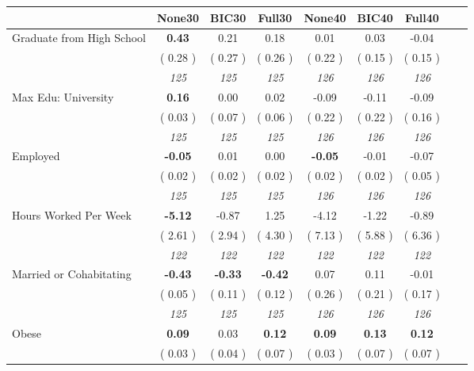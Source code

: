 \begin{tabular}{l c c c c c c c c}
\toprule
 & None30 & BIC30 & Full30 & None40 & BIC40 & Full40 \\
\midrule
Graduate from High School & \textbf{      0.43 } &      0.21 &      0.18 &      0.01 &      0.03 &     -0.04 \\
& (     0.28 ) & (     0.27 ) & (     0.26 ) & (     0.22 ) & (     0.15 ) & (     0.15 ) \\
& \textit{ 125 } & \textit{ 125 } & \textit{ 125 } & \textit{ 126 } & \textit{ 126 } & \textit{ 126 } \\
Max Edu: University & \textbf{      0.16 } &      0.00 &      0.02 &     -0.09 &     -0.11 &     -0.09 \\
& (     0.03 ) & (     0.07 ) & (     0.06 ) & (     0.22 ) & (     0.22 ) & (     0.16 ) \\
& \textit{ 125 } & \textit{ 125 } & \textit{ 125 } & \textit{ 126 } & \textit{ 126 } & \textit{ 126 } \\
Employed & \textbf{     -0.05 } &      0.01 &      0.00 & \textbf{     -0.05 } &     -0.01 &     -0.07 \\
& (     0.02 ) & (     0.02 ) & (     0.02 ) & (     0.02 ) & (     0.02 ) & (     0.05 ) \\
& \textit{ 125 } & \textit{ 125 } & \textit{ 125 } & \textit{ 126 } & \textit{ 126 } & \textit{ 126 } \\
Hours Worked Per Week & \textbf{     -5.12 } &     -0.87 &      1.25 &     -4.12 &     -1.22 &     -0.89 \\
& (     2.61 ) & (     2.94 ) & (     4.30 ) & (     7.13 ) & (     5.88 ) & (     6.36 ) \\
& \textit{ 122 } & \textit{ 122 } & \textit{ 122 } & \textit{ 122 } & \textit{ 122 } & \textit{ 122 } \\
Married or Cohabitating & \textbf{     -0.43 } & \textbf{     -0.33 } & \textbf{     -0.42 } &      0.07 &      0.11 &     -0.01 \\
& (     0.05 ) & (     0.11 ) & (     0.12 ) & (     0.26 ) & (     0.21 ) & (     0.17 ) \\
& \textit{ 125 } & \textit{ 125 } & \textit{ 125 } & \textit{ 126 } & \textit{ 126 } & \textit{ 126 } \\
Obese & \textbf{      0.09 } &      0.03 & \textbf{      0.12 } & \textbf{      0.09 } & \textbf{      0.13 } & \textbf{      0.12 } \\
& (     0.03 ) & (     0.04 ) & (     0.07 ) & (     0.03 ) & (     0.07 ) & (     0.07 ) \\

\end{tabular}
